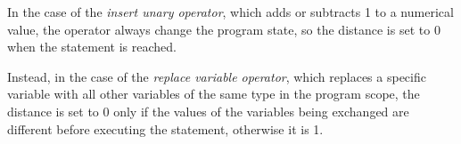 In the case of the \textit{insert unary operator}, which adds or subtracts 1 to a numerical value, the operator always change the program state, so the distance is set to 0 when the statement is reached. 

Instead, in the case of the \textit{replace variable operator}, which replaces a specific variable with all other variables of the same type in the program scope, the distance is set to 0 only if the values of the variables being exchanged are different before executing the statement, otherwise it is 1.

\endinput

\subsubsection{Symbolic execution test generation} %

\begin{itemize}

	\item Dynamic symbolic execution approaches: embed the mutant killing conditions within the executable program and guide test generation towards these conditions.

	\item Papadakis et al.~\cite{papadakis2011automatically, papadakis2010towards}:
	Embed mutant infection conditions (cause a corruption to the program state) within the schematic functions that are produced by mutant schemata. Basically, we have all mutants encoded in a single executable with their killing conditions. Then, using dynamic symbolic execution we can directly produce test cases that targets those infection conditions.
\end{itemize}


